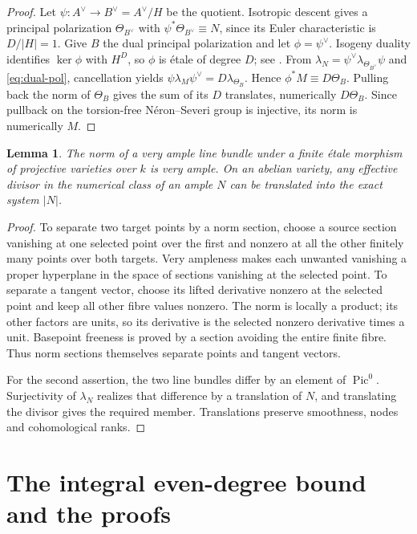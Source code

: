 \documentclass[11pt]{article}
\newtheorem{lemma}[theorem]{Lemma}
\theoremstyle{definition}\newtheorem{definition}[theorem]{Definition}
\theoremstyle{remark}\newtheorem{remark}[theorem]{Remark}
\newcommand{\Pic}{\operatorname{Pic}}
\begin{document}
\begin{proof}
Let $\psi:A^\vee\to B^\vee=A^\vee/H$ be the quotient. Isotropic descent gives a principal polarization $\Theta_{B^\vee}$ with $\psi^*\Theta_{B^\vee}\equiv N$, since its Euler characteristic is $D/|H|=1$. Give $B$ the dual principal polarization and let $\phi=\psi^\vee$. Isogeny duality identifies $\ker\phi$ with $H^D$, so $\phi$ is \'etale of degree $D$; see \citet[Theorem~7.5, p.~100]{EGM}. From
$\lambda_N=\psi^\vee\lambda_{\Theta_{B^\vee}}\psi$
and \eqref{eq:dual-pol}, cancellation yields
$\psi\lambda_M\psi^\vee=D\lambda_{\Theta_B}$.
Hence $\phi^*M\equiv D\Theta_B$. Pulling back the norm of $\Theta_B$ gives the sum of its $D$ translates, numerically $D\Theta_B$. Since pullback on the torsion-free N\'eron--Severi group is injective, its norm is numerically $M$.
\end{proof}

\begin{lemma}\label{lem:exact-system}
The norm of a very ample line bundle under a finite \'etale morphism of projective varieties over $k$ is very ample. On an abelian variety, any effective divisor in the numerical class of an ample $N$ can be translated into the exact system $|N|$.
\end{lemma}
\begin{proof}
To separate two target points by a norm section, choose a source section vanishing at one selected point over the first and nonzero at all the other finitely many points over both targets. Very ampleness makes each unwanted vanishing a proper hyperplane in the space of sections vanishing at the selected point. To separate a tangent vector, choose its lifted derivative nonzero at the selected point and keep all other fibre values nonzero. The norm is locally a product; its other factors are units, so its derivative is the selected nonzero derivative times a unit. Basepoint freeness is proved by a section avoiding the entire finite fibre. Thus norm sections themselves separate points and tangent vectors.

For the second assertion, the two line bundles differ by an element of $\Pic^0$. Surjectivity of $\lambda_N$ realizes that difference by a translation of $N$, and translating the divisor gives the required member. Translations preserve smoothness, nodes and cohomological ranks.
\end{proof}

\section{The integral even-degree bound and the proofs}
\end{document}
